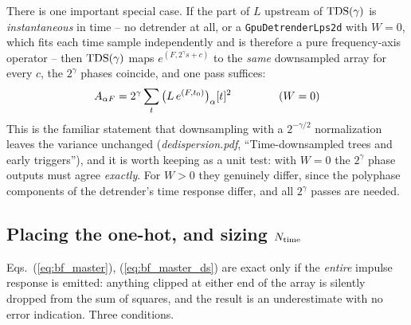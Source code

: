 \documentclass{article}
\numberwithin{equation}{section}   %
\def\TDS{{\rm TDS}}
\newcommand{\ddnotes}[1]{{\em dedispersion.pdf}, ``#1''}
\begin{document}
There is one important special case. If the part of $L$ upstream of $\TDS(\gamma)$ is
{\em instantaneous} in time -- no detrender at all, or a {\tt GpuDetrenderLps2d} with $W=0$, which fits
each time sample independently and is therefore a pure frequency-axis operator -- then
$\TDS(\gamma)$ maps $e^{(F, 2^\gamma s + c)}$ to the {\em same} downsampled array for every $c$,
the $2^\gamma$ phases coincide, and one pass suffices:
\begin{equation}
A_{\alpha F} = 2^\gamma \sum_t \big( L \, e^{(F,t_0)} \big)_\alpha[t]^2
  \hspace{1.5cm} (W=0)
\end{equation}
This is the familiar statement that downsampling with a $2^{-\gamma/2}$ normalization leaves the
variance unchanged (\ddnotes{Time-downsampled trees and early triggers}), and it is worth keeping as a unit test: with
$W=0$ the $2^\gamma$ phase outputs must agree {\em exactly}. For $W>0$ they genuinely differ, since
the polyphase components of the detrender's time response differ, and all $2^\gamma$ passes are
needed.

\subsection{Placing the one-hot, and sizing $N_{\rm time}$}
\label{ssec:bf_sizing}

Eqs.\ (\ref{eq:bf_master}), (\ref{eq:bf_master_ds}) are exact only if the {\em entire} impulse
response is emitted: anything clipped at either end of the array is silently dropped from the sum
of squares, and the result is an underestimate with no error indication. Three conditions.
\end{document}
